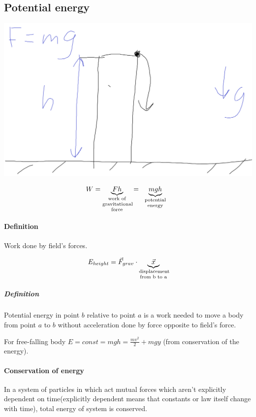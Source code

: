 \subsection{Potential energy}



\begin{center}
	\includegraphics[width=\linewidth]{./lect9/pic1.png}
\end{center}

$$W=\underbrace{Fh}_{\parbox{1.5cm}{\scriptsize \centering work of \\ gravitational \\ force}}=\underbrace{mgh}_{\parbox{1.5cm}{\scriptsize \centering potential \\ energy}}$$

\paragraph{Definition} Work done by field's forces.

$$E_{height} = \vec{F}_{grav} \cdot \underbrace{\vec{x}}_{\parbox{1.5cm}{\scriptsize \centering displacement from b to a}}$$

\subparagraph{Definition} Potential energy in point $b$ relative to point $a$ is a work needed to move a body from point $a$ to $b$ without acceleration done by force opposite to field's force.

For free-falling body $E=const=mgh=\frac{mv^2}{2}+mgy$ (from conservation of the energy).

\paragraph{Conservation of energy} In a system of particles in which act mutual forces which aren't explicitly dependent on time(explicitly dependent means that constants or law itself change with time), total energy of system is conserved.

